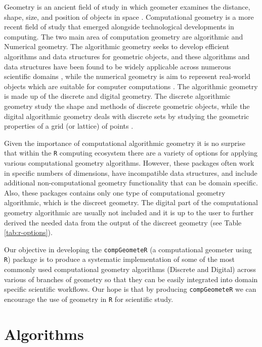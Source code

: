 \documentclass[12pt, a4paper]{article}
\begin{document}
Geometry is an ancient field of study in which geometer examines the distance, shape, size, and position of objects in space \citep{gowers-2003}.  Computational geometry is a more recent field of study that emerged alongside technological developments in computing. The two main area of computation geometry are algorithmic and Numerical geometry.  The algorithmic geometry seeks to develop efficient algorithms and data structures for geometric objects, and these algorithms and data structures have been found to be widely applicable across numerous scientific domains \citep{de-berg-2008}, while the numerical geometry is aim to represent real-world objects which are suitable for computer computations \citep{kimmel2012numerical}. The algorithmic geometry is made up of the discrete and digital geometry.  The discrete algorithmic geometry study the shape and methods of discrete geometric objects, while the digital algorithmic geometry deals with discrete sets  by studying the geometric properties of a grid (or lattice) of points \citep{boissonnat1998algorithmic}. 


Given the importance of computational algorithmic geometry it is no surprise that within the \texttt{R} \citep{r-core-team-2019} computing ecosystem there are a variety of options for applying various computational geometry algorithms.  However, these packages often work in specific numbers of dimensions, have incompatible data structures, and include additional non-computational geometry functionality that can be domain specific. Also, these packages contains only one type of computational geometry algorithmic, which is the discreet geometry. The digital part of the computational geometry algorithmic are usually not included  and it is up to the user to further derived the needed data from the output of the discreet geometry (see Table \ref{tab:r-options}).

Our objective in developing the \texttt{compGeometeR} (a computational geometer using \texttt{R}) package is to produce a systematic implementation of some of the most commonly used computational geometry algorithms (Discrete and Digital) across various of branches of geometry so that they can be easily integrated into domain specific scientific workflows.  Our hope is that by producing \texttt{compGeometeR} we can encourage the use of geometry in \texttt{R} for scientific study.

\section{Algorithms}
\end{document}
